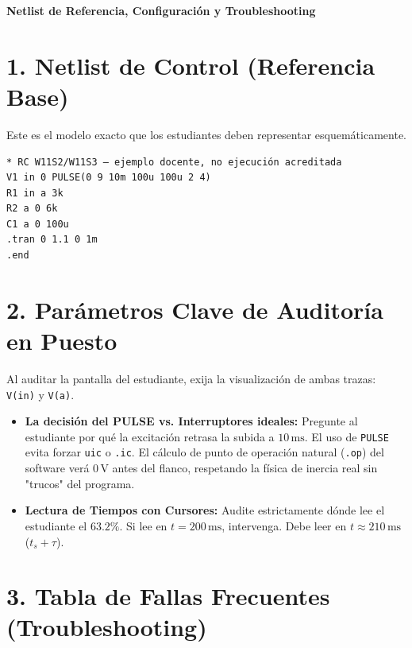 \documentclass[11pt, a4paper]{article}
\begin{document}
\begin{tcolorbox}[colback=ucbblue!5!white, colframe=ucbblue, title=\textbf{Guía de Auditoría Docente: Ejecución Transitoria en LTspice}]
    \centering \textbf{Netlist de Referencia, Configuración y Troubleshooting}
\end{tcolorbox}

\section*{1. Netlist de Control (Referencia Base)}
Este es el modelo exacto que los estudiantes deben representar esquemáticamente.
\begin{verbatim}
* RC W11S2/W11S3 — ejemplo docente, no ejecución acreditada
V1 in 0 PULSE(0 9 10m 100u 100u 2 4)
R1 in a 3k
R2 a 0 6k
C1 a 0 100u
.tran 0 1.1 0 1m
.end
\end{verbatim}

\section*{2. Parámetros Clave de Auditoría en Puesto}
Al auditar la pantalla del estudiante, exija la visualización de ambas trazas: \texttt{V(in)} y \texttt{V(a)}.

\begin{itemize}
    \item \textbf{La decisión del PULSE vs. Interruptores ideales:} Pregunte al estudiante por qué la excitación retrasa la subida a $10\,\text{ms}$. El uso de \texttt{PULSE} evita forzar \texttt{uic} o \texttt{.ic}. El cálculo de punto de operación natural (\texttt{.op}) del software verá $0\,\text{V}$ antes del flanco, respetando la física de inercia real sin "trucos" del programa.
    \item \textbf{Lectura de Tiempos con Cursores:} Audite estrictamente dónde lee el estudiante el $63.2\%$. Si lee en $t=200\,\text{ms}$, intervenga. Debe leer en $t \approx 210\,\text{ms}$ ($t_s + \tau$).
\end{itemize}

\section*{3. Tabla de Fallas Frecuentes (Troubleshooting)}
\end{document}
